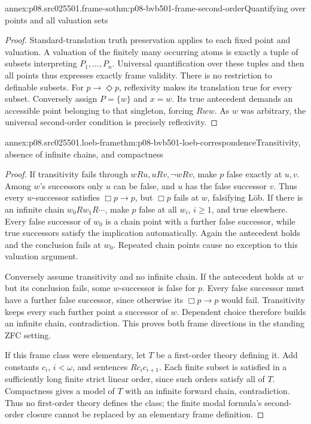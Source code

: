 \begin{annexitem}{annex:p08.src025501.frame-so}{thm:p08-bvb501-frame-second-order}{Quantifying over points and all valuation sets}
\begin{proof}
Standard-translation truth preservation applies to each fixed point
and valuation. A valuation of the finitely many occurring atoms is
exactly a tuple of subsets interpreting \(P_1,\ldots,P_n\).
Universal quantification over these tuples and then all points thus
expresses exactly frame validity. There is no restriction to definable
subsets. For \(p\to\Diamond p\), reflexivity makes its
translation true for every subset. Conversely assign \(P=\{w\}\)
and \(x=w\). Its true antecedent demands an accessible point
belonging to that singleton, forcing \(Rww\). As \(w\) was
arbitrary, the universal second-order condition is precisely reflexivity.
\end{proof}
\end{annexitem}

\begin{annexitem}{annex:p08.src025501.loeb-frame}{thm:p08-bvb501-loeb-correspondence}{Transitivity, absence of infinite chains, and compactness}
\begin{proof}
If transitivity fails through \(wRu,uRv,\neg wRv\), make
\(p\) false exactly at \(u,v\). Among \(w\)'s successors
only \(u\) can be false, and \(u\) has the false successor
\(v\). Thus every \(w\)-successor satisfies \(\Box p\to p\),
but \(\Box p\) fails at \(w\), falsifying L\"ob. If there
is an infinite chain \(w_0Rw_1R\cdots\), make \(p\) false
at all \(w_i\), \(i\geq1\), and true elsewhere. Every false
successor of \(w_0\) is a chain point with a further false
successor, while true successors satisfy the implication automatically.
Again the antecedent holds and the conclusion fails at \(w_0\).
Repeated chain points cause no exception to this valuation argument.

Conversely assume transitivity and no infinite chain. If the antecedent
holds at \(w\) but its conclusion fails, some \(w\)-successor
is false for \(p\). Every false successor must have a further false
successor, since otherwise its \(\Box p\to p\) would fail.
Transitivity keeps every such further point a successor of \(w\).
Dependent choice therefore builds an infinite chain, contradiction.
This proves both frame directions in the standing ZFC setting.

If this frame class were elementary, let \(T\) be a first-order
theory defining it. Add constants \(c_i\), \(i<\omega\), and
sentences \(Rc_ic_{i+1}\). Each finite subset is satisfied in a
sufficiently long finite strict linear order, since such orders satisfy
all of \(T\). Compactness gives a model of \(T\) with an
infinite forward chain, contradiction. Thus no first-order theory
defines the class; the finite modal formula's second-order closure
cannot be replaced by an elementary frame definition.
\end{proof}
\end{annexitem}

